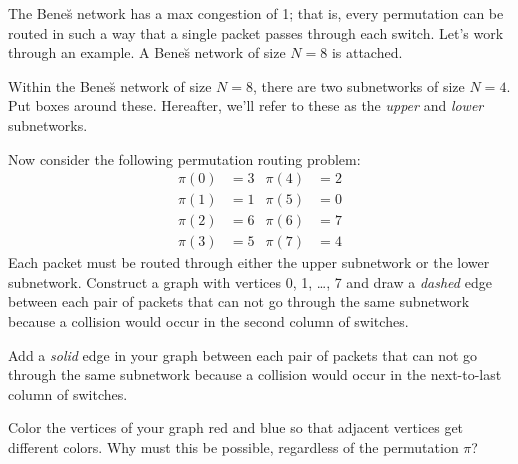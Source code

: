 \begin{problem}
The Bene\u{s} network has a max congestion of 1; that is, every
permutation can be routed in such a way that a single packet passes
through each switch.  Let's work through an example.  A Bene\u{s} network
of size $N = 8$ is attached.

\bparts

\ppart Within the Bene\u{s} network of size $N = 8$, there are two
subnetworks of size $N = 4$.  Put boxes around these.  Hereafter,
we'll refer to these as the \textit{upper} and \textit{lower}
subnetworks.

\begin{solution}


\end{solution}

\ppart Now consider the following permutation routing problem:
%
\begin{align*}
\pi(0) & = 3 & \pi(4) & = 2 \\
\pi(1) & = 1 & \pi(5) & = 0 \\
\pi(2) & = 6 & \pi(6) & = 7 \\
\pi(3) & = 5 & \pi(7) & = 4
\end{align*}
%
Each packet must be routed through either the upper subnetwork or the
lower subnetwork.  Construct a graph with vertices 0, 1, \ldots, 7 and
draw a \textit{dashed} edge between each pair of packets that can not
go through the same subnetwork because a collision would occur in the
second column of switches.

\begin{solution}


\end{solution}

\ppart Add a \textit{solid} edge in your graph between each pair of
packets that can not go through the same subnetwork because a
collision would occur in the next-to-last column of switches.

\begin{solution}


\end{solution}

\ppart Color the vertices of your graph red and blue so that adjacent
vertices get different colors.  Why must this be possible, regardless
of the permutation $\pi$?


\end{problem}
